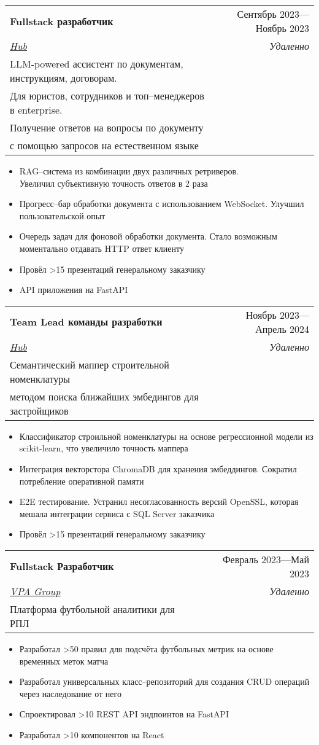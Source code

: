 \documentclass[letterpaper,11pt]{article}
\makeatletter
\newcommand{\resumeItem}[1]{
  \item\small{
    {#1 \vspace{-2pt}}
  }
}
\newcommand{\resumeSubheading}[5]{
  \vspace{-2pt}\item
    \begin{tabular*}{0.97\textwidth}[t]{l@{\extracolsep{\fill}}r}
      \textbf{#1} & #2 \\
      \textit{\small#3} & \textit{\small #4} \\
      \small#5
    \end{tabular*}\vspace{-7pt}
}
\newcommand{\resumeItemListStart}{\begin{itemize}}
\newcommand{\resumeItemListEnd}{\end{itemize}\vspace{-5pt}}
\makeatother
\begin{document}
    \resumeSubheading
      {Fullstack разработчик}{Сентябрь 2023—Ноябрь 2023}
      {\href{https://t.me/abouthub}{\underline{Hub}}}{Удаленно}
      {LLM-powered ассистент по документам, инструкциям, договорам.\\Для юристов, сотрудников и топ–менеджеров в enterprise.\\Получение ответов на вопросы по документу\\с помощью запросов на естественном языке}
      \resumeItemListStart
        \resumeItem{RAG–система из комбинации двух различных ретриверов. \\Увеличил субъективную точность ответов в 2 раза}
        \resumeItem{Прогресс–бар обработки документа с использованием WebSocket. Улучшил пользовательской опыт}
        \resumeItem{Очередь задач для фоновой обработки документа. Стало возможным моментально отдавать HTTP ответ клиенту}
        \resumeItem{Провёл >15 презентаций генеральному заказчику}
        \resumeItem{API приложения на FastAPI}
      \resumeItemListEnd

    \resumeSubheading
      {Team Lead команды разработки}{Ноябрь 2023—Апрель 2024}
      {\href{https://t.me/abouthub}{\underline{Hub}}}{Удаленно}
      {Семантический маппер строительной номенклатуры\\методом поиска ближайших эмбедингов для застройщиков}
      \resumeItemListStart
        \resumeItem{Классификатор строильной номенклатуры на основе регрессионной модели из scikit-learn, что увеличило точность маппера}
        \resumeItem{Интеграция векторстора ChromaDB для хранения эмбеддингов. Сократил потребление оперативной памяти}
        \resumeItem{E2E тестирование. Устранил несогласованность версий OpenSSL, которая мешала интеграции сервиса с SQL Server заказчика}
        \resumeItem{Провёл >15 презентаций генеральному заказчику}
      \resumeItemListEnd

  \resumeSubheading
      {Fullstack Разработчик}{Февраль 2023—Май 2023}
      {\href{https://vpa.group}{\underline{VPA Group}}}{Удаленно}
      {Платформа футбольной аналитики для РПЛ}

      \resumeItemListStart
        \resumeItem{Разработал >50 правил для подсчёта футбольных метрик на основе временных меток матча}
        \resumeItem{Разработал универсальных класс–репозиторий для создания CRUD операций через наследование от него}
        \resumeItem{Спроектировал >10 REST API эндпоинтов на FastAPI}
        \resumeItem{Разработал >10 компонентов на React}
      \resumeItemListEnd
      
\end{document}
